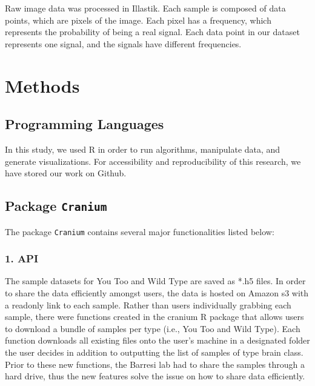 \documentclass[10pt,letterpaper]{article}
\begin{document}
Raw image data was processed in Illastik. Each sample is composed of
data points, which are pixels of the image. Each pixel has a frequency,
which represents the probability of being a real signal. Each data point
in our dataset represents one signal, and the signals have different
frequencies.

\hypertarget{methods}{%
\section{Methods}\label{methods}}

\hypertarget{programming-languages}{%
\subsection{Programming Languages}\label{programming-languages}}

In this study, we used R in order to run algorithms, manipulate data,
and generate visualizations. For accessibility and reproducibility of
this research, we have stored our work on Github.

\hypertarget{package-cranium}{%
\subsection{\texorpdfstring{Package
\texttt{Cranium}}{Package Cranium}}\label{package-cranium}}

The package \texttt{Cranium} contains several major functionalities
listed below:

\hypertarget{api}{%
\subsubsection{1. API}\label{api}}

The sample datasets for You Too and Wild Type are saved as *.h5 files.
In order to share the data efficiently amongst users, the data is hosted
on Amazon s3 with a readonly link to each sample. Rather than users
individually grabbing each sample, there were functions created in the
cranium R package that allows users to download a bundle of samples per
type (i.e., You Too and Wild Type). Each function downloads all existing
files onto the user's machine in a designated folder the user decides in
addition to outputting the list of samples of type brain class. Prior to
these new functions, the Barresi lab had to share the samples through a
hard drive, thus the new features solve the issue on how to share data
efficiently.
\end{document}
